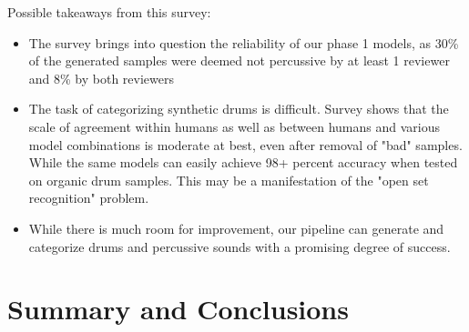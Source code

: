 \documentclass{nime-alternate} %
\begin{document}
Possible takeaways from this survey:
\begin{itemize}
    \item The survey brings into question the reliability of our phase 1 models, as 30\% of the generated samples were deemed not percussive by at least 1 reviewer and 8\% by both reviewers
    \item The task of categorizing synthetic drums is difficult. Survey shows that the scale of agreement within humans as well as between humans and various model combinations is moderate at best, even after removal of "bad" samples.  While the same models can easily achieve 98+ percent accuracy when tested on organic drum samples. This may be a manifestation of the "open set recognition" problem. 
    \item While there is much room for improvement, our pipeline can generate and categorize drums and percussive sounds with a promising degree of success. 
\end{itemize}
\begin{center}

\begin{table}
\caption{\label{kappa_table}Table of Fleiss' kappa coefficient to measure the degree of agreement between humans (HvH), humans with FC model (H+FC), humans with CNNLSTM model, humans with all models (H+ALL), and the 3 models }
\end{table}
\end{center}

\section{Summary and Conclusions}
\end{document}

